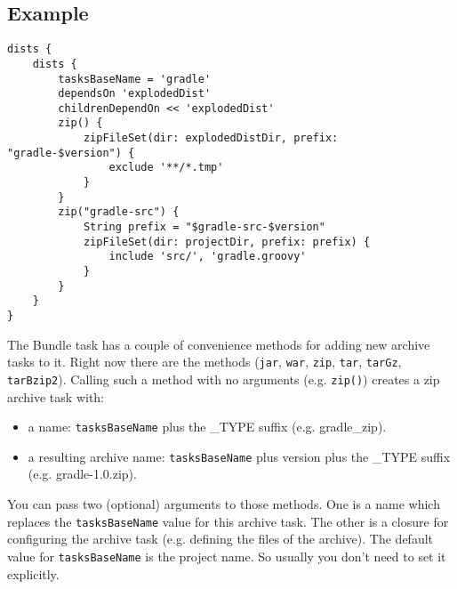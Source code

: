 \subsection{Example} %
\label{sub:example}
\begin{Verbatim}
dists {
	dists {
	    tasksBaseName = 'gradle'
	    dependsOn 'explodedDist'
	    childrenDependOn << 'explodedDist'
	    zip() {
	        zipFileSet(dir: explodedDistDir, prefix: "gradle-$version") {
	            exclude '**/*.tmp'
	        }
	    }
	    zip("gradle-src") {
	        String prefix = "$gradle-src-$version"
	        zipFileSet(dir: projectDir, prefix: prefix) {
	            include 'src/', 'gradle.groovy'
	        }
	    }
	}
}	
\end{Verbatim}
The Bundle task has a couple of convenience methods for adding new archive tasks to it. Right now there are the methods (\texttt{jar}, \texttt{war}, \texttt{zip}, \texttt{tar}, \texttt{tarGz}, \texttt{tarBzip2}). Calling such a method with no arguments (e.g. \texttt{zip()}) creates a zip archive task with:
\begin{itemize}
	\item a name: \texttt{tasksBaseName} plus the \_TYPE suffix (e.g. gradle\_zip).
	\item a resulting archive name: \texttt{tasksBaseName} plus version plus the \_TYPE suffix (e.g. gradle-1.0.zip).
\end{itemize}
You can pass two (optional) arguments to those methods. One is a name which replaces the \texttt{tasksBaseName} value for this archive task. The other is a closure for configuring the archive task (e.g. defining the files of the archive).
The default value for \texttt{tasksBaseName} is the project name. So usually you don't need to set it explicitly. 

